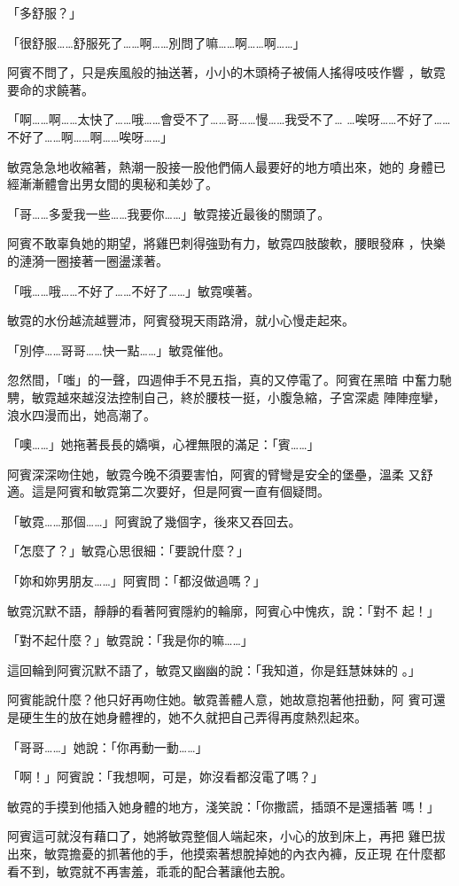 「多舒服？」

「很舒服……舒服死了……啊……別問了嘛……啊……啊……」

阿賓不問了，只是疾風般的抽送著，小小的木頭椅子被倆人搖得吱吱作響
，敏霓要命的求饒著。

「啊……啊……太快了……哦……會受不了……哥……慢……我受不了…
…唉呀……不好了……不好了……啊……啊……唉呀……」

敏霓急急地收縮著，熱潮一股接一股他們倆人最要好的地方噴出來，她的
身體已經漸漸體會出男女間的奧秘和美妙了。

「哥……多愛我一些……我要你……」敏霓接近最後的關頭了。

阿賓不敢辜負她的期望，將雞巴刺得強勁有力，敏霓四肢酸軟，腰眼發麻
，快樂的漣漪一圈接著一圈盪漾著。

「哦……哦……不好了……不好了……」敏霓嘆著。

敏霓的水份越流越豐沛，阿賓發現天雨路滑，就小心慢走起來。

「別停……哥哥……快一點……」敏霓催他。

忽然間，「嗤」的一聲，四週伸手不見五指，真的又停電了。阿賓在黑暗
中奮力馳騁，敏霓越來越沒法控制自己，終於腰枝一挺，小腹急縮，子宮深處
陣陣痙攣，浪水四漫而出，她高潮了。

「噢……」她拖著長長的嬌嗔，心裡無限的滿足：「賓……」

阿賓深深吻住她，敏霓今晚不須要害怕，阿賓的臂彎是安全的堡壘，溫柔
又舒適。這是阿賓和敏霓第二次要好，但是阿賓一直有個疑問。

「敏霓……那個……」阿賓說了幾個字，後來又吞回去。

「怎麼了？」敏霓心思很細：「要說什麼？」

「妳和妳男朋友……」阿賓問：「都沒做過嗎？」

敏霓沉默不語，靜靜的看著阿賓隱約的輪廓，阿賓心中愧疚，說：「對不
起！」

「對不起什麼？」敏霓說：「我是你的嘛……」

這回輪到阿賓沉默不語了，敏霓又幽幽的說：「我知道，你是鈺慧妹妹的
。」

阿賓能說什麼？他只好再吻住她。敏霓善體人意，她故意抱著他扭動，阿
賓可還是硬生生的放在她身體裡的，她不久就把自己弄得再度熱烈起來。

「哥哥……」她說：「你再動一動……」

「啊！」阿賓說：「我想啊，可是，妳沒看都沒電了嗎？」

敏霓的手摸到他插入她身體的地方，淺笑說：「你撒謊，插頭不是還插著
嗎！」

阿賓這可就沒有藉口了，她將敏霓整個人端起來，小心的放到床上，再把
雞巴拔出來，敏霓擔憂的抓著他的手，他摸索著想脫掉她的內衣內褲，反正現
在什麼都看不到，敏霓就不再害羞，乖乖的配合著讓他去脫。

